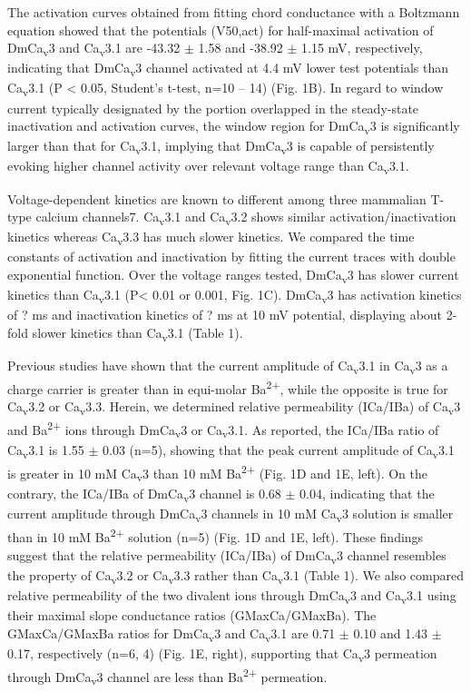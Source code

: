The activation curves obtained from fitting chord conductance with a Boltzmann equation showed that the potentials (V50,act) for half-maximal activation of DmCa\textsubscript{v}3 and Ca\textsubscript{v}3.1 are -43.32 $\pm$ 1.58 and -38.92 $\pm$ 1.15 mV, respectively, indicating that DmCa\textsubscript{v}3 channel activated at 4.4 mV lower test potentials than Ca\textsubscript{v}3.1 (P < 0.05, Student's t-test, n=10 -- 14) (Fig. 1B).
In regard to window current typically designated by the portion overlapped in the steady-state inactivation and activation curves, the window region for DmCa\textsubscript{v}3 is significantly larger than that for Ca\textsubscript{v}3.1, implying that DmCa\textsubscript{v}3 is capable of persistently evoking higher channel activity over relevant voltage range than Ca\textsubscript{v}3.1.

Voltage-dependent kinetics are known to different among three mammalian T-type calcium channels7.
Ca\textsubscript{v}3.1 and Ca\textsubscript{v}3.2 shows similar activation/inactivation kinetics whereas Ca\textsubscript{v}3.3 has much slower kinetics.
We compared the time constants of activation and inactivation by fitting the current traces with double exponential function.
Over the voltage ranges tested, DmCa\textsubscript{v}3 has slower current kinetics than Ca\textsubscript{v}3.1 (P< 0.01 or 0.001, Fig. 1C).
DmCa\textsubscript{v}3 has activation kinetics of ? ms and inactivation kinetics of ? ms at 10 mV potential, displaying about 2-fold slower kinetics than Ca\textsubscript{v}3.1 (Table 1).

Previous studies have shown that the current amplitude of Ca\textsubscript{v}3.1 in Ca\textsubscript{v}3 as a charge carrier is greater than in equi-molar Ba\textsuperscript{2+}, while the opposite is true for Ca\textsubscript{v}3.2 or Ca\textsubscript{v}3.3\cite{mcrory:2000aa,shcheglovitov:2007aa}.
Herein, we determined relative permeability (ICa/IBa) of Ca\textsubscript{v}3 and Ba\textsuperscript{2+} ions through DmCa\textsubscript{v}3 or Ca\textsubscript{v}3.1.
As reported, the ICa/IBa ratio of Ca\textsubscript{v}3.1 is 1.55 $\pm$ 0.03 (n=5), showing that the peak current amplitude of Ca\textsubscript{v}3.1 is greater in 10 mM Ca\textsubscript{v}3 than 10 mM Ba\textsuperscript{2+} (Fig. 1D and 1E, left).
On the contrary, the ICa/IBa of DmCa\textsubscript{v}3 channel is 0.68 $\pm$ 0.04, indicating that the current amplitude through DmCa\textsubscript{v}3 channels in 10 mM Ca\textsubscript{v}3 solution is smaller than in 10 mM Ba\textsuperscript{2+} solution (n=5) (Fig. 1D and 1E, left).
These findings suggest that the relative permeability (ICa/IBa) of DmCa\textsubscript{v}3 channel resembles the property of Ca\textsubscript{v}3.2 or Ca\textsubscript{v}3.3 rather than Ca\textsubscript{v}3.1 (Table 1).
We also compared relative permeability of the two divalent ions through DmCa\textsubscript{v}3 and Ca\textsubscript{v}3.1 using their maximal slope conductance ratios (GMaxCa/GMaxBa).
The GMaxCa/GMaxBa ratios for DmCa\textsubscript{v}3 and Ca\textsubscript{v}3.1 are 0.71 $\pm$ 0.10 and 1.43 $\pm$ 0.17, respectively (n=6, 4) (Fig. 1E, right), supporting that Ca\textsubscript{v}3 permeation through DmCa\textsubscript{v}3 channel are less than Ba\textsuperscript{2+} permeation.

